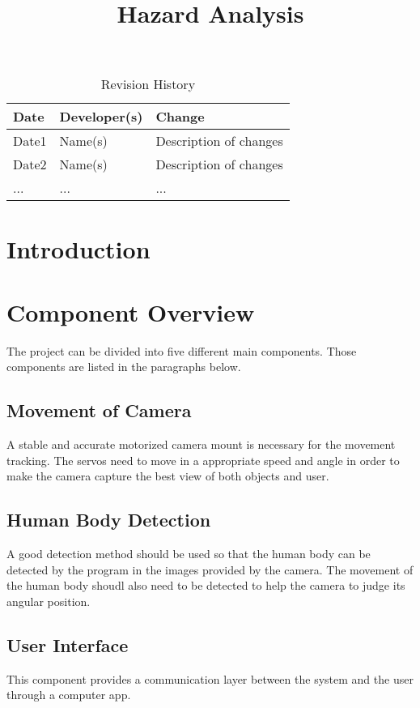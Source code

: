 \documentclass{article}
\title{Hazard Analysis\\\progname}
\author{\authname}
\date{}
\begin{document}
\begin{table}[hp]
\caption{Revision History} \label{TblRevisionHistory}
\begin{tabularx}{\textwidth}{llX}
\toprule
\textbf{Date} & \textbf{Developer(s)} & \textbf{Change}\\
\midrule
Date1 & Name(s) & Description of changes\\
Date2 & Name(s) & Description of changes\\
... & ... & ...\\
\bottomrule
\end{tabularx}
\end{table}

\newpage

\maketitle

\newpage


\tableofcontents

\newpage
\section{Introduction}

\section{Component Overview}
The project can be divided into five different main components. Those components are listed in the paragraphs below.
\subsection{Movement of Camera}
A stable and accurate motorized camera mount is necessary for the movement tracking. The servos need to move in a appropriate speed and angle in order to make the camera capture the best view of both objects and user.
\subsection{Human Body Detection}
A good detection method should be used so that the human body can be detected by the program in the images provided by the camera. The movement of the human body shoudl also need to be detected to help the camera to judge its angular position.
\subsection{User Interface}
This component provides a communication layer between the system and the user through a computer app.
\end{document}
